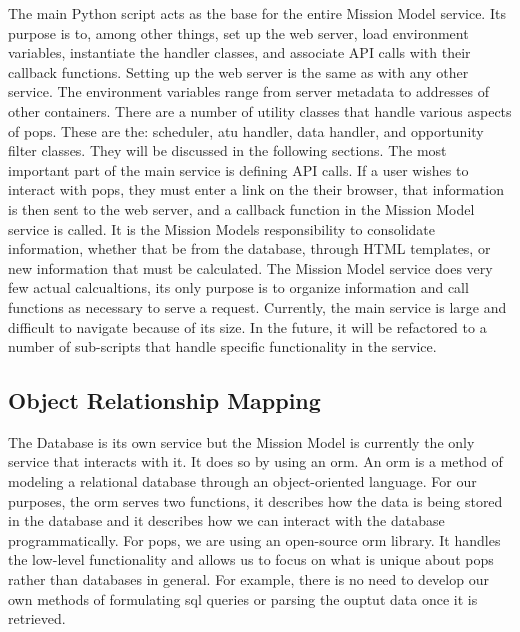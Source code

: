 The main Python script acts as the base for the entire Mission Model service.
Its purpose is to, among other things, set up the web server, load environment
variables, instantiate the handler classes, and associate API calls with their
callback functions. Setting up the web server is the same as with any other
service. The environment variables range from server metadata to addresses of
other containers. There are a number of utility classes that handle various
aspects of \gls{pops}. These are the: scheduler, \gls{atu} handler, data
handler, and opportunity filter classes. They will be discussed in the
following sections. The most important part of the main service is defining API
calls. If a user wishes to interact with \gls{pops}, they must enter a link on
the their browser, that information is then sent to the web server, and a
callback function in the Mission Model service is called. It is the Mission
Models responsibility to consolidate information, whether that be from the
database, through HTML templates, or new information that must be calculated.
The Mission Model service does very few actual calcualtions, its only purpose
is to organize information and call functions as necessary to serve a request.
Currently, the main service is large and difficult to navigate because of its
size. In the future, it will be refactored to a number of sub-scripts that
handle specific functionality in the service.

\subsection{Object Relationship Mapping}

The Database is its own service but the Mission Model is currently the only
service that interacts with it. It does so by using an \gls{orm}. An \gls{orm}
is a method of modeling a relational database through an object-oriented
language. For our purposes, the \gls{orm} serves two functions, it describes
how the data is being stored in the database and it describes how we can
interact with the database programmatically. For \gls{pops}, we are using an
open-source \gls{orm} library. It handles the low-level functionality and
allows us to focus on what is unique about \gls{pops} rather than databases in
general. For example, there is no need to develop our own methods of
formulating \gls{sql} queries or parsing the ouptut data once it is retrieved. 


